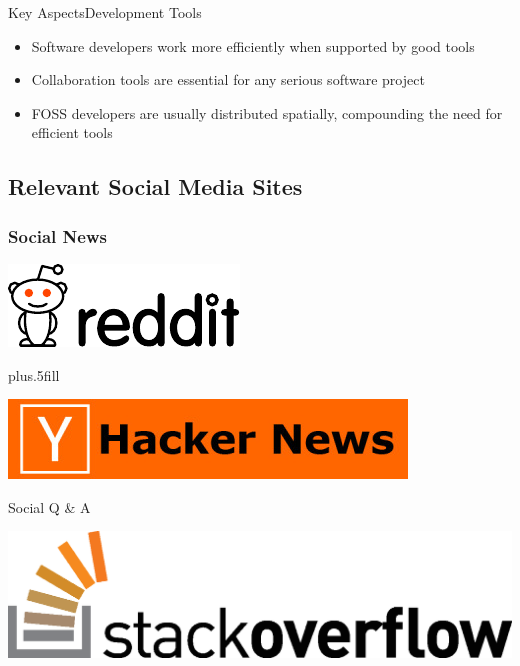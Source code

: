 \documentclass{beamer}
\begin{document}
\begin{frame}{Key Aspects}{Development Tools}

  \begin{itemize}
    \item Software developers work more efficiently when supported by
      good tools
    \item Collaboration tools are essential for any serious software project
    \item FOSS developers are usually distributed spatially,
        compounding the need for efficient tools

  \end{itemize}
\end{frame}

\subsection{Relevant Social Media Sites}

\begin{frame}
  \frametitle{Social News}

  \begin{center}
    \includegraphics[width=.6\textwidth]{Reddit_logo.pdf}

  \vskip0pt plus.5fill

    \includegraphics[width=.6\textwidth]{hacker-news_logo.jpg}
  \end{center}

\end{frame}


\begin{frame}{Social Q \& A}
  \begin{center}
    \includegraphics[width=.6\textwidth]{so-logo.eps}
  \end{center}
\end{frame}
\end{document}
